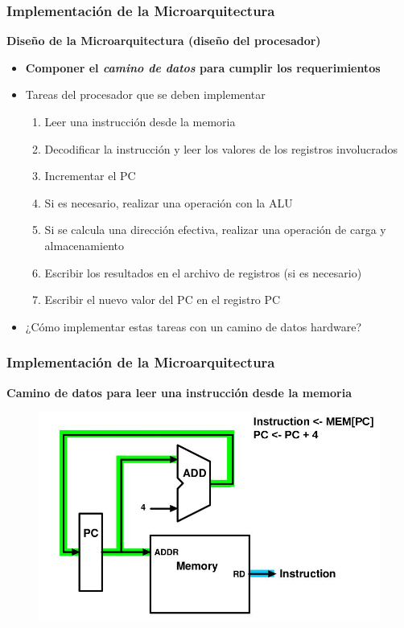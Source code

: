 \documentclass[aspectratio=169,compress]{beamer}
\begin{document}
\begin{footnotesize}
\begin{frame}
\frametitle{Implementación de la Microarquitectura}
\begin{center}\textbf{Diseño de la Microarquitectura (diseño del procesador)}\end{center}
\begin{itemize}
\item \textbf{Componer el \textit{camino de datos} para cumplir los requerimientos}
\end{itemize}

\begin{itemize}
\item Tareas del procesador que se deben implementar
\begin{enumerate}
\item Leer una instrucción desde la memoria
\item Decodificar la instrucción y leer los valores de los registros involucrados
\item Incrementar el PC
\item Si es necesario, realizar una operación con la ALU
\item Si se calcula una dirección efectiva, realizar una operación de carga y almacenamiento
\item Escribir los resultados en el archivo de registros (si es necesario)
\item Escribir el nuevo valor del PC en el registro PC
\end{enumerate}
\item ¿Cómo implementar estas tareas con un camino de datos hardware?
\end{itemize}

\end{frame}



\begin{frame}
\frametitle{Implementación de la Microarquitectura}
\begin{center}\textbf{Camino de datos para leer una instrucción desde la memoria}\end{center}
\begin{figure}
\includegraphics[scale=0.3]{images/fetch.jpg} 
\end{figure}


\end{frame}
\end{footnotesize}
\end{document}
